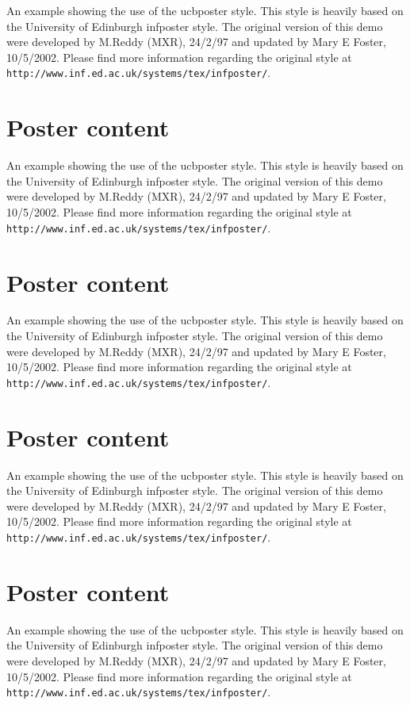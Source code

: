 \documentclass{ucbposter}
\begin{document}
An example showing the use of the ucbposter style. This style is
heavily based on the University of Edinburgh infposter style. The
original version of this demo were developed by M.Reddy (MXR), 24/2/97
and updated by Mary E Foster, 10/5/2002. Please find more information
regarding the original style at {\tt
http://www.inf.ed.ac.uk/systems/tex/infposter/}.

\section{Poster content}

An example showing the use of the ucbposter style. This style is
heavily based on the University of Edinburgh infposter style. The
original version of this demo were developed by M.Reddy (MXR), 24/2/97
and updated by Mary E Foster, 10/5/2002. Please find more information
regarding the original style at {\tt
http://www.inf.ed.ac.uk/systems/tex/infposter/}.

\section{Poster content}

An example showing the use of the ucbposter style. This style is
heavily based on the University of Edinburgh infposter style. The
original version of this demo were developed by M.Reddy (MXR), 24/2/97
and updated by Mary E Foster, 10/5/2002. Please find more information
regarding the original style at {\tt
http://www.inf.ed.ac.uk/systems/tex/infposter/}.

\section{Poster content}

An example showing the use of the ucbposter style. This style is
heavily based on the University of Edinburgh infposter style. The
original version of this demo were developed by M.Reddy (MXR), 24/2/97
and updated by Mary E Foster, 10/5/2002. Please find more information
regarding the original style at {\tt
http://www.inf.ed.ac.uk/systems/tex/infposter/}.

\section{Poster content}

An example showing the use of the ucbposter style. This style is
heavily based on the University of Edinburgh infposter style. The
original version of this demo were developed by M.Reddy (MXR), 24/2/97
and updated by Mary E Foster, 10/5/2002. Please find more information
regarding the original style at {\tt
http://www.inf.ed.ac.uk/systems/tex/infposter/}.
\end{document}

